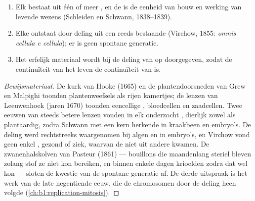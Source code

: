 \begin{proposition}[De celtheorie]\label{prop:b1:cell-unit-of-life:theory}
\begin{enumerate}
  \item Elk  bestaat uit één of meer , en de  is de
        eenheid van bouw en werking van levende wezens
        (Schleiden en Schwann, 1838--1839).
  \item Elke  ontstaat door deling uit een reeds bestaande 
        (Virchow, 1855: \emph{omnis cellula e cellula}); er is geen
        spontane generatie.
  \item Het erfelijk materiaal wordt bij de deling van  op 
        doorgegeven, zodat de continuïteit van het leven de continuïteit
        van  is.
\end{enumerate}
\end{proposition}
\begin{proof}[Bewijsmateriaal]
De kurk van Hooke (1665) en de plantendoorsneden van Grew en Malpighi toonden
plantenweefsels als rijen kamertjes; de lenzen van Leeuwenhoek (jaren 1670)
toonden eencellige , bloedcellen en zaadcellen. Twee eeuwen van steeds
betere lenzen vonden  in elk onderzocht , dierlijk zowel als
plantaardig, zodra Schwann  met een kern herkende in kraakbeen en embryo's.
De deling werd rechtstreeks waargenomen bij algen en in embryo's, en Virchow vond
geen enkel , gezond of ziek, waarvan de  niet uit andere 
kwamen. De zwanenhalskolven van Pasteur (1861) --- bouillons die maandenlang
steriel bleven zolang stof ze niet kon bereiken, en binnen enkele dagen krioelden
zodra dat wel kon --- sloten de kwestie van de spontane generatie af. De derde
uitspraak is het werk van de late negentiende eeuw, die de chromosomen door de
deling heen volgde (\cref{ch:b1:replication-mitosis}).
\end{proof}

